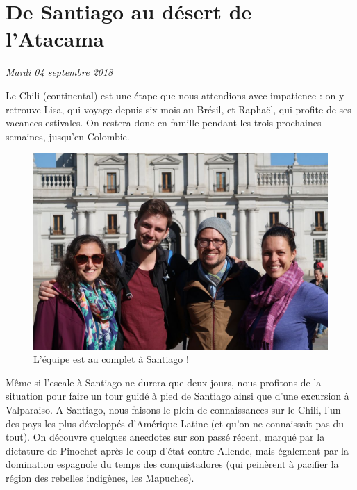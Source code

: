 \hypertarget{de-santiago-au-duxe9sert-de-latacama}{%
\section{De Santiago au désert de
l'Atacama}\label{de-santiago-au-duxe9sert-de-latacama}}

\emph{Mardi 04 septembre 2018}

Le Chili (continental) est une étape que nous attendions avec impatience
: on y retrouve Lisa, qui voyage depuis six mois au Brésil, et Raphaël,
qui profite de ses vacances estivales. On restera donc en famille
pendant les trois prochaines semaines, jusqu'en Colombie.

\begin{figure}
\centering
\includegraphics{images/20180904_teamsantiago.JPG}
\caption{L'équipe est au complet à Santiago !}
\end{figure}

Même si l'escale à Santiago ne durera que deux jours, nous profitons de
la situation pour faire un tour guidé à pied de Santiago ainsi que d'une
excursion à Valparaiso. A Santiago, nous faisons le plein de
connaissances sur le Chili, l'un des pays les plus développés d'Amérique
Latine (et qu'on ne connaissait pas du tout). On découvre quelques
anecdotes sur son passé récent, marqué par la dictature de Pinochet
après le coup d'état contre Allende, mais également par la domination
espagnole du temps des conquistadores (qui peinèrent à pacifier la
région des rebelles indigènes, les Mapuches).

